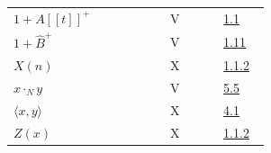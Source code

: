 \begin{longtable}{@{}>{\raggedright\arraybackslash}p{0.50\linewidth}>{\raggedright\arraybackslash}p{0.17\linewidth}>{\raggedright\arraybackslash}p{0.15\linewidth}@{}}
\(1+A[[t]]^+\) & V & \hyperlink{sga6.e05.para.1-1}{1.1}\\
\(1+\widehat B^+\) & V & \hyperlink{sga6.e05.para.1-11}{1.11}\\
\(X(n)\) & X & \hyperlink{sga6.e10.prop.1-1-2}{1.1.2}\\
\(x\cdot_N y\) & V & \hyperlink{sga6.e05.para.5-5}{5.5}\\
\(\langle x,y\rangle\) & X & \hyperlink{sga6.e10.sec.4.1}{4.1}\\
\(Z(x)\) & X & \hyperlink{sga6.e10.prop.1-1-2}{1.1.2}\\
\bottomrule
\end{longtable}
\endgroup

